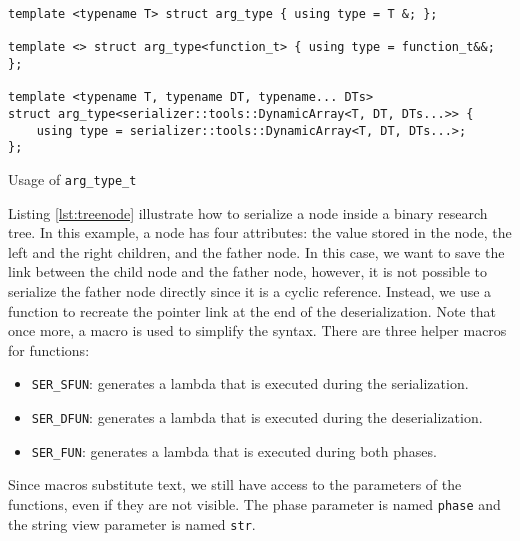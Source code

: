 \begin{listing}[ht!]
\begin{verbatim}
template <typename T> struct arg_type { using type = T &; };

template <> struct arg_type<function_t> { using type = function_t&&; };

template <typename T, typename DT, typename... DTs>
struct arg_type<serializer::tools::DynamicArray<T, DT, DTs...>> {
    using type = serializer::tools::DynamicArray<T, DT, DTs...>;
};
\end{verbatim}
\caption{Usage of \texttt{arg\_type\_t}}
\label{lst:mlargtype}
\end{listing}

Listing \ref{lst:treenode} illustrate how to serialize a node inside a binary
research tree. In this example, a node has four attributes: the value stored in
the node, the left and the right children, and the father node. In this case, we
want to save the link between the child node and the father node, however, it is
not possible to serialize the father node directly since it is a cyclic
reference. Instead, we use a function to recreate the pointer link at the end of
the deserialization. Note that once more, a macro is used to simplify the
syntax. There are three helper macros for functions:

\begin{itemize}
  \item \texttt{SER\_SFUN}: generates a lambda that is executed during the
    serialization.
  \item \texttt{SER\_DFUN}: generates a lambda that is executed during the
    deserialization.
  \item \texttt{SER\_FUN}: generates a lambda that is executed during both
    phases.
\end{itemize}

Since macros substitute text, we still have access to the parameters of the
functions, even if they are not visible. The phase parameter is named
\texttt{phase} and the string view parameter is named \texttt{str}.


